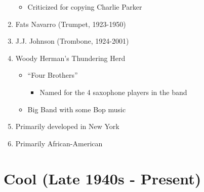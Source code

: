 \documentclass[]{article}
\providecommand{\tightlist}{%
  \setlength{\itemsep}{0pt}\setlength{\parskip}{0pt}}
\begin{document}
\begin{enumerate}
  \begin{itemize}
  \tightlist
  \item
    Criticized for copying Charlie Parker
  \end{itemize}
\item
  Fats Navarro (Trumpet, 1923-1950)
\item
  J.J. Johnson (Trombone, 1924-2001)
\item
  Woody Herman's Thundering Herd

  \begin{itemize}
  \tightlist
  \item
    ``Four Brothers''

    \begin{itemize}
    \tightlist
    \item
      Named for the 4 saxophone players in the band
    \end{itemize}
  \item
    Big Band with some Bop music
  \end{itemize}
\item
  Primarily developed in New York
\item
  Primarily African-American
\end{enumerate}

\section{Cool (Late 1940s - Present)}\label{cool-late-1940s---present}
\end{document}
